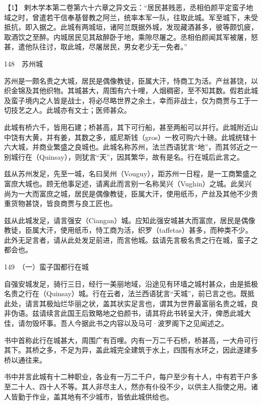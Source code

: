 \documentclass[12pt,UTF8]{ctexbook}
\begin{document}
【1】 剌木学本第二卷第六十六章之异文云：“居民甚贱恶，丞相伯颜平定蛮子地域之时，曾遣若干信奉基督教之阿兰，统率本军一队，往取此城。军至城下，未受抵抗，即入据之。此城有两城垣，诸阿兰既据外城，发现藏酒甚多，彼等颇饥疲，取酒饮之至醉。内城居民见其敌醉卧于地，乘隙尽屠之。丞相伯颜闻其军被屠，怒甚，遣他队往讨，取此城，尽屠居民，男女老少无一免者。”





148　苏州城

苏州是一颇名贵之大城，居民是偶像教徒，臣属大汗，恃商工为活。产丝甚饶，以织金锦及其他织物。其城甚大，周围有六十哩，人烟稠密，至不知其数。假若此城及蛮子境内之人皆是战士，将必尽略世界之余土，幸而非战士，仅为商贾与工于一切技艺之人。此城亦有文士；医师甚众。

此城有桥六千，皆用石建；桥甚高，其下可行船，甚至两船可以并行。此城附近山中饶有大黄，并有姜，其数之多，威尼斯钱（gros）一枚可购六十磅。此城统辖十六大城，并商业繁盛之良城也。此城名称苏州，法兰西语犹言“地”，而其邻近之一别城行在（Quinsay），则犹言“天”，因其繁华，故有是名。行在城后此言之。

兹从苏州发足，先至一城，名曰吴州（Vouguy），距苏州一日程，是一工商繁盛之富庶大城也。顾无他事足述，请离此而言别一名称吴兴（Vughin）之城。此吴兴尚为一大而富庶之城，居民是偶像教徒，臣属大汗，使用纸币，产丝及其他不少贵重货物甚饶，皆良商贾与良工匠也。

兹从此城发足，请言强安（Ciangan）城。应知此强安城甚大而富庶，居民是偶像教徒，臣属大汗，使用纸币，恃工商为活，织罗（taffetas）甚多，而种类不少。此外无足言者，请从此处发足前进，而言他城。兹请先言极名贵之行在城，蛮子之都会也。





149　（一）蛮子国都行在城

自强安城发足，骑行三日，经行一美丽地域，沿途见有环墙之城村甚众，由是抵极名贵之行在（Quinsay）城。行在云者，法兰西语犹言“天城”，前已言之也。既抵此处，请言其极灿烂华丽之状，盖其状实足言也，谓其为世界最富丽名贵之城，良非伪语。兹请续言此国王后致略地之伯颜书，请其将此书转呈大汗，俾悉此城大佳，请勿毁坏事。吾人今据此书之内容以及马可·波罗阁下之见闻述之。

书中首称此行在城甚大，周围广有百哩。内有一万二千石桥，桥甚高，一大舟可行其下。其桥之多，不足为异，盖此城完全建筑于水上，四围有水环之，因此遂建多桥以通往来。

书中并言此城有十二种职业，各业有一万二千户，每户至少有十人，中有若干户多至二十人、四十人不等。其人非尽主人，然亦有仆役不少，以供主人指使之用。诸人皆勤于作业，盖其地有不少城市，皆依此城供给也。
\end{document}
